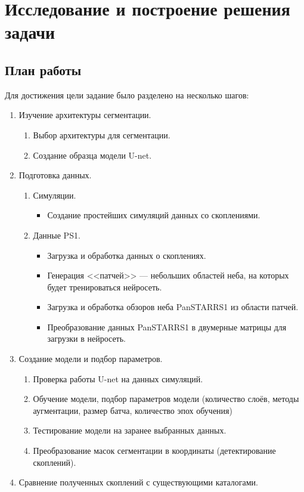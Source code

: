 \chapter{Исследование и построение решения задачи}
\label{cha:ch_3}

\section{План работы}
Для достижения цели задание было разделено на несколько шагов:

\begin{enumerate}

    \item Изучение архитектуры сегментации.
    \begin{enumerate}
        \item Выбор архитектуры для сегментации.
        \item Создание образца модели U-net.
    \end{enumerate}

    \item Подготовка данных.
    \begin{enumerate}
        \item Симуляции.
        \begin{itemize}
            \item Создание простейших симуляций данных со скоплениями.
        \end{itemize}
        \item Данные PS1.
        \begin{itemize}
            \item Загрузка и обработка данных о скоплениях.
            \item Генерация <<патчей>> --- небольших областей неба, на которых будет тренироваться нейросеть.
            \item Загрузка и обработка обзоров неба PanSTARRS1 из области патчей.
            \item Преобразование данных PanSTARRS1 в двумерные матрицы для загрузки в нейросеть.
        \end{itemize}
    \end{enumerate}

    \item Создание модели и подбор параметров.
    \begin{enumerate}
        \item Проверка работы U-net на данных симуляций.
        \item Обучение модели, подбор параметров модели (количество слоёв, методы аугментации, размер 
            батча, количество эпох обучения)
        \item Тестирование модели на заранее выбранных данных.
        \item Преобразование масок сегментации в координаты (детектирование скоплений).
    \end{enumerate}

    \item Сравнение полученных скоплений с существующими каталогами.
\end{enumerate}

